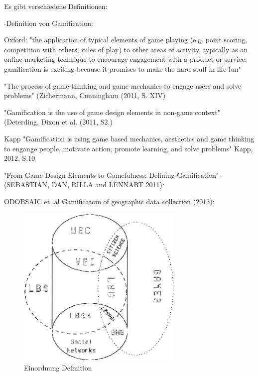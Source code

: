 Es gibt verschiedene Definitionen:

-Definition von Gamification:

Oxford:
"the application of typical elements of game playing (e.g. point scoring, competition with others, rules of play) to other areas of activity, typically as an online marketing technique to encourage engagement with a product or service:
gamification is exciting because it promises to make the hard stuff in life fun"

"The process of game-thinking and game mechanics to engage users and solve problems"
(Zichermann, Cunningham (2011, S. XIV)

"Gamification is the use of game design elements in non-game context"
(Deterding, Dixon et al. (2011, S2.)

Kapp "Gamification is using game based mechanics, aesthetics and game thinking to engange people, motivate action, promote learning, and solve problems"
Kapp, 2012, S.10


"From Game Design Elements to Gamefulness: Defining Gamification" - (SEBASTIAN, DAN, RILLA and LENNART 2011):


ODOBSAIC et. al Gamificatoin of geographic data collection (2013):

\begin{figure}[H]
\begin{center}
\includegraphics[width=80mm]{images/ch3_img01_LBG_SN_etc.png}
\caption{Einordnung Definition}
\label{img:ch3_img01_LBG_SN_etc}
\end{center}
\end{figure}

